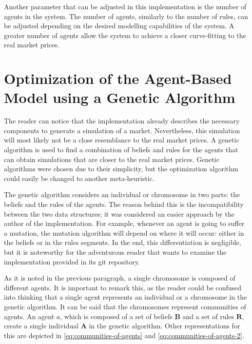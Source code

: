 Another parameter that can be adjusted in this implementation is the number of
agents in the system. The number of agents, similarly to the number of rules,
can be adjusted depending on the desired modelling capabilities of the system. A
greater number of agents allow the system to achieve a closer curve-fitting to
the real market prices.

\section{Optimization of the Agent-Based Model using a Genetic Algorithm}
\label{section:optimization-of-the-agent-based-model-using-a-genetic-algorithm}

The reader can notice that the implementation already describes 
the necessary components to generate a simulation of a
market. Nevertheless, this simulation will most likely not be a close
resemblance to the real market prices. A genetic algorithm is used to find a
combination of beliefs and rules for the agents that can obtain simulations that
are closer to the real market prices. Genetic algorithms were chosen due to
their simplicity, but the optimization algorithm could easily be changed to
another meta-heuristic.  %

The genetic algorithm considers an individual or chromosome in two parts: the
beliefs and the rules of the agents. The reason behind this is the
incompatibility between the two data structures; it was considered an easier
approach by the author of the implementation. For example, whenever an agent is
going to suffer a mutation, the mutation algorithm will depend on where it will
occur: either in the beliefs or in the rules segments. In the end, this
differentiation is negligible, but it is noteworthy for the adventurous reader
that wants to examine the implementation provided in its git repository.

As it is noted in the previous paragraph, a single chromosome is composed of
different agents. It is important to remark this, as the reader could be
confused into thinking that a single agent represents an individual or a
chromosome in the genetic algorithm. It can be said that the chromosomes
represent communities of agents. An agent $a$, which is composed
of a set of beliefs $\bm{B}$ and a set of rules $\bm{R}$, create a single
individual $\bm{A}$ in the genetic algorithm. Other representations for this are
depicted in \ref{eq:communities-of-agents} and \ref{eq:communities-of-agents-2}.

